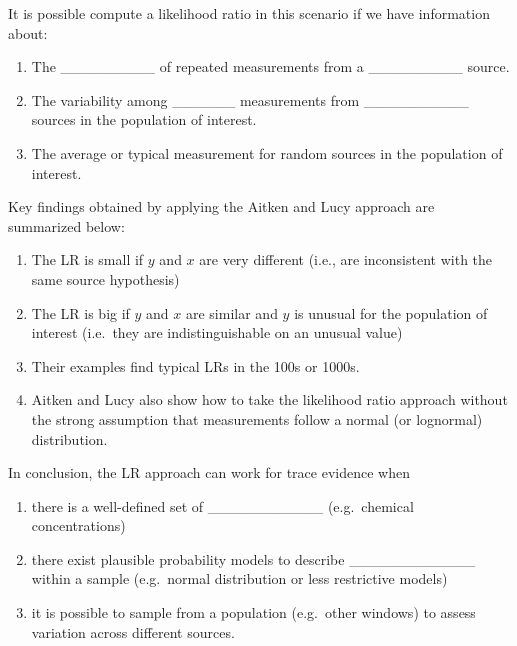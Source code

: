 \documentclass[]{book}
\providecommand{\tightlist}{%
  \setlength{\itemsep}{0pt}\setlength{\parskip}{0pt}}
\theoremstyle{definition}
\theoremstyle{definition}
\theoremstyle{remark}
\begin{document}
It is possible compute a likelihood ratio in this scenario if we have
information about:

\begin{enumerate}
\def\labelenumi{\arabic{enumi}.}
\tightlist
\item
  The \_\_\_\_\_\_\_\_\_ of repeated measurements from a
  \_\_\_\_\_\_\_\_\_ source. \vspace{.1in}
\item
  The variability among \_\_\_\_\_\_ measurements from
  \_\_\_\_\_\_\_\_\_\_ sources in the population of
  interest.\vspace{.1in}
\item
  The average or typical measurement for random sources in the
  population of interest.
\end{enumerate}

Key findings obtained by applying the Aitken and Lucy approach are
summarized below:

\begin{enumerate}
\def\labelenumi{\arabic{enumi}.}
\tightlist
\item
  The LR is small if \(y\) and \(x\) are very different (i.e., are
  inconsistent with the same source hypothesis)
\item
  The LR is big if \(y\) and \(x\) are similar and \(y\) is unusual for
  the population of interest (i.e.~they are indistinguishable on an
  unusual value)
\item
  Their examples find typical LRs in the 100s or 1000s.
\item
  Aitken and Lucy also show how to take the likelihood ratio approach
  without the strong assumption that measurements follow a normal (or
  lognormal) distribution.
\end{enumerate}

In conclusion, the LR approach can work for trace evidence when

\begin{enumerate}
\def\labelenumi{\arabic{enumi}.}
\tightlist
\item
  there is a well-defined set of \_\_\_\_\_\_\_\_\_\_\_ (e.g.~chemical
  concentrations)\vspace{.1in}
\item
  there exist plausible probability models to describe
  \_\_\_\_\_\_\_\_\_\_\_\_ within a sample (e.g.~normal distribution or
  less restrictive models)\vspace{.1in}
\item
  it is possible to sample from a population (e.g.~other windows) to
  assess variation across different sources.
\end{enumerate}
\end{document}
